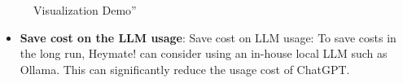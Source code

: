 \documentclass[
  11pt,
  a4paper,
  DIV=11,
  numbers=noendperiod]{scrartcl}
\providecommand{\tightlist}{%
  \setlength{\itemsep}{0pt}\setlength{\parskip}{0pt}}\usepackage{longtable,booktabs,array}
\begin{document}
\begin{figure}

\caption{\label{fig-viz-demo}Visualization Demo''}


\end{figure}%

\begin{itemize}
\tightlist
\item
  \textbf{Save cost on the LLM usage}: Save cost on LLM usage: To save
  costs in the long run, Heymate! can consider using an in-house local
  LLM such as Ollama. This can significantly reduce the usage cost of
  ChatGPT.
\end{itemize}
\end{document}
